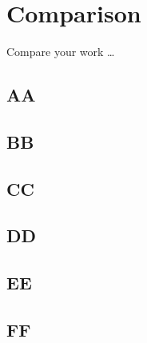 \chapter{Comparison}

Compare your work \ldots

\section{AA}
\section{BB}
\section{CC}
\section{DD}
\section{EE}
\section{FF}
